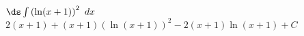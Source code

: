 {$\ds \int \left(\ln (x+1)\right)^2\ dx$}
{%
$2 (x+1)+(x+1) \left(\ln (x+1)\right)^2-2 (x+1)\ln (x+1)+C$
}

